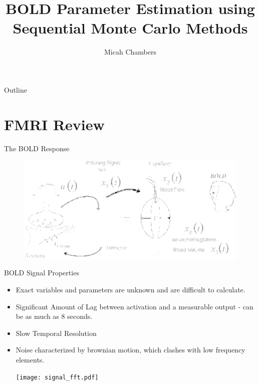 \documentclass{beamer}
\title{BOLD Parameter Estimation using Sequential Monte Carlo Methods}
\author{Micah Chambers}
\institute {Virginia Tech Bioimaging Systems Lab}
\begin{document}
\begin{frame}
  \titlepage
\end{frame}

\begin{frame}{Outline}
  \tableofcontents
\end{frame}

\section{FMRI Review}
\begin{frame}{The BOLD Response}
\begin{figure}
\includegraphics[scale=.23]{model}
\caption{
    \tiny
    \cite{nonlinearfiltering}
}
\end{figure}
\end{frame}

\begin{frame}{BOLD Signal Properties}
  \begin{itemize}
    \item Exact variables and parameters are unknown and are
        difficult to calculate.
    \item Significant Amount of Lag between activation
        and a measurable output - can be as much as 8 seconds.
    \item Slow Temporal Resolution
    \item Noise characterized by brownian motion, which clashes with low 
        frequency elements.
    \begin{center}
    \texttt{[image: signal\_fft.pdf]}
    \end{center}
  \end{itemize}
\end{frame}
\end{document}

